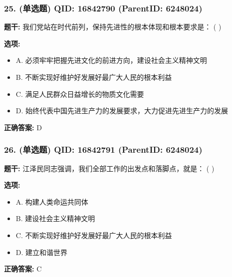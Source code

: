 \documentclass[12pt,UTF8]{ctexart}
\begin{document}
\subsubsection*{25. (单选题) \small QID: 16842790 (ParentID: 6248024)}

\textbf{题干:}
我们党站在时代前列，保持先进性的根本体现和根本要求是： ( )



\textbf{选项:}
\begin{itemize}[leftmargin=*]

  \item A. 必须牢牢把握先进文化的前进方向，建设社会主义精神文明

  \item B. 不断实现好维护好发展好最广大人民的根本利益

  \item C. 满足人民群众日益增长的物质文化需要

  \item D. 始终代表中国先进生产力的发展要求，大力促进先进生产力的发展

\end{itemize}

\textbf{正确答案:}
D

\vspace{0.3em}\hrulefill\vspace{0.7em}

\subsubsection*{26. (单选题) \small QID: 16842791 (ParentID: 6248024)}

\textbf{题干:}
江泽民同志强调，我们全部工作的出发点和落脚点，就是： ( )



\textbf{选项:}
\begin{itemize}[leftmargin=*]

  \item A. 构建人类命运共同体

  \item B. 建设社会主义精神文明

  \item C. 不断实现好维护好发展好最广大人民的根本利益

  \item D. 建立和谐世界

\end{itemize}

\textbf{正确答案:}
C
\end{document}
